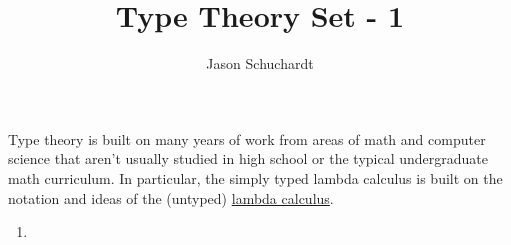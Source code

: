 \documentclass{article}
\title{Type Theory Set - 1}
\author{Jason Schuchardt}
\begin{document}
\maketitle

Type theory is built on many years of work from areas of math
and computer science
that aren't usually studied in high school or the typical
undergraduate math curriculum. In particular, the simply typed 
lambda calculus is built on the notation and ideas of the
(untyped) \href{https://en.wikipedia.org/wiki/Lambda_calculus}{lambda calculus}.

\begin{enumerate}[(1)]
    \item 
\end{enumerate}
\end{document}
